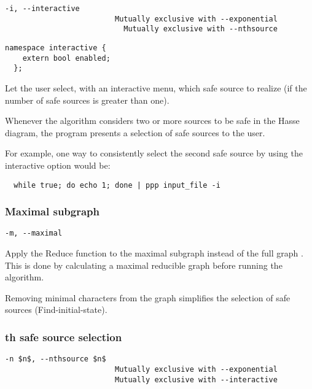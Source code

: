 \begin{lstlisting}[aboveskip=\smallskipamount]
  -i, --interactive
                         Mutually exclusive with --exponential
                           Mutually exclusive with --nthsource
\end{lstlisting}

\begin{lstlisting}[style=c++_block, aboveskip=\smallskipamount]
  namespace interactive {
    extern bool enabled;
  };
\end{lstlisting}

Let the user select, with an interactive menu, which safe source to realize (if the number of safe sources is greater than one).

Whenever the algorithm considers two or more sources to be safe in the Hasse diagram, the program presents a selection of safe sources to the user.

For example, one way to consistently select the second safe source by using the interactive option would be:

\begin{lstlisting}
  while true; do echo 1; done | ppp input_file -i
\end{lstlisting}

\subsubsection*{Maximal subgraph}

\begin{lstlisting}[aboveskip=\smallskipamount]
  -m, --maximal
\end{lstlisting}

Apply the Reduce function to the maximal subgraph \grbcm{} instead of the full graph \grb{}.
This is done by calculating a maximal reducible graph before running the algorithm.

Removing minimal characters from the graph simplifies the selection of safe sources (Find-initial-state).

\subsubsection*{th safe source selection}

\begin{lstlisting}[aboveskip=\smallskipamount]
  -n $n$, --nthsource $n$
                         Mutually exclusive with --exponential
                         Mutually exclusive with --interactive
\end{lstlisting}

